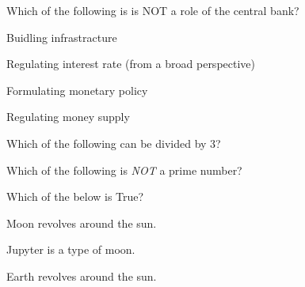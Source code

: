 \documentclass[12pt]{exam}
\begin{document}
\begin{questions}

    \question Which of the following is is NOT a role of the central bank?
    
        \begin{oneparchoices}
        
            \choice Buidling infrastracture
        
            \choice Regulating interest rate (from a broad perspective)
        
            \choice Formulating monetary policy
        
            \choice Regulating money supply
        
        \end{oneparchoices}

    \question Which of the following can be divided by 3?
    
        \begin{oneparchoices}
        
        
        
        
        
        \end{oneparchoices}

    \question Which of the following is \textit{NOT} a prime number?
    
        \begin{oneparchoices}
        
        
        
        
        
        \end{oneparchoices}

    \question Which of the below is True?
    
        \begin{oneparchoices}
        
            \choice Moon revolves around the sun.
        
            \choice Jupyter is a type of moon.
        
            \choice Earth revolves around the sun.
        
        \end{oneparchoices}


\end{questions}
\end{document}
